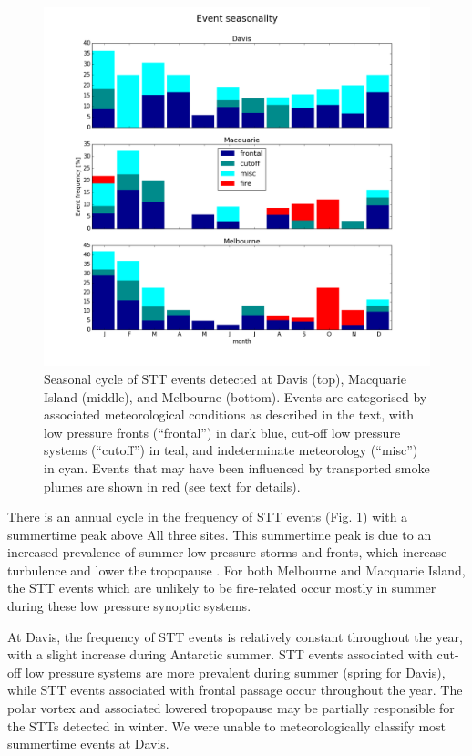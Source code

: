 \documentclass{article}
\begin{document}
  \begin{figure}[!htbp]
    \begin{center}
    \includegraphics[width=1.0\columnwidth]{figures/summary_season.png}
    \caption{Seasonal cycle of STT events detected at Davis (top), Macquarie Island (middle), and Melbourne (bottom).
      Events are categorised by associated meteorological conditions as described in the text, with low pressure fronts (“frontal”) in dark blue, cut-off low pressure systems (“cutoff”) in teal, and indeterminate meteorology (“misc”) in cyan. 
      Events that may have been influenced by transported smoke plumes are shown in red (see text for details).}
    \label{fig:SummarySeasonality}
    \end{center}
  \end{figure}
  
  There is an annual cycle in the frequency of STT events  (Fig. \ref{fig:SummarySeasonality}) with a summertime peak above All three sites.
  This summertime peak is due to an increased prevalence of summer low-pressure storms and fronts, which increase turbulence and lower the tropopause \citep{Reutter2015}.
  For both Melbourne and Macquarie Island, the STT events which are unlikely to be fire-related occur mostly in summer during these low pressure synoptic systems.
  
  At Davis, the frequency of STT events is relatively constant throughout the year, with a slight increase during Antarctic summer.
  STT events associated with cut-off low pressure systems are more prevalent during summer (spring for Davis), while STT events associated with frontal passage occur throughout the year.
  The polar vortex and associated lowered tropopause may be partially responsible for the STTs detected in winter.
  We were unable to meteorologically classify most summertime events at Davis.
\end{document}
